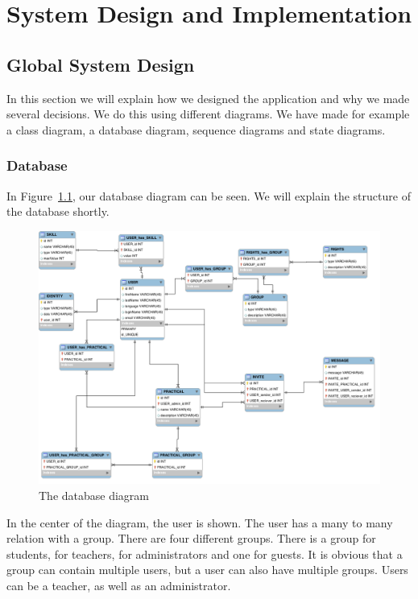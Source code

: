 \chapter{System Design and Implementation}
\label{sec:design_implementation}

\section{Global System Design}
In this section we will explain how we designed the application and why we made several decisions.
We do this using different diagrams.
We have made for example a class diagram, a database diagram, sequence diagrams and state diagrams.

\subsection{Database}
In Figure~\ref{database_diagram}, our database diagram can be seen.
We will explain the structure of the database shortly.

\begin{figure}[h]
    \centering
    \captionsetup{justification=centering}
    \includegraphics[width=\textwidth, frame]{images/database_diagram}
    \caption{The database diagram}
    \label{database_diagram}
\end{figure}

In the center of the diagram, the user is shown.
The user has a many to many relation with a group.
There are four different groups.
There is a group for students, for teachers, for administrators and one for guests.
It is obvious that a group can contain multiple users, but a user can also have multiple groups.
Users can be a teacher, as well as an administrator.


